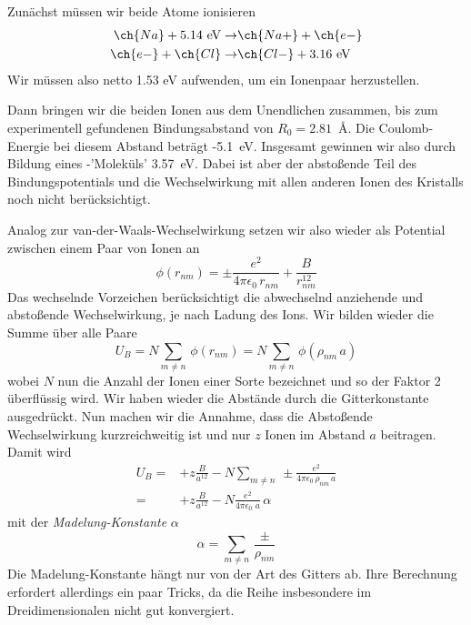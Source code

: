 Zunächst müssen wir beide Atome ionisieren
\begin{align}
 \ch{Na} + 5.14\text{ eV} \rightarrow  & \ch{Na+} + \ch{e-} \\
  \ch{e-}  + \ch{Cl} \rightarrow  & \ch{Cl-} + 3.16\text{ eV}
\end{align}
Wir müssen also netto 1.53 eV aufwenden, um ein Ionenpaar herzustellen.

Dann bringen wir die beiden Ionen aus dem Unendlichen zusammen, bis zum experimentell gefundenen Bindungsabstand von $R_0 = 2.81$~\AA. Die Coulomb-Energie bei diesem Abstand beträgt -5.1~eV. Insgesamt gewinnen wir also durch Bildung eines -'Moleküls' 3.57~eV. Dabei ist aber der abstoßende Teil des Bindungspotentials und die Wechselwirkung mit allen anderen Ionen des Kristalls noch nicht berücksichtigt.

Analog zur van-der-Waals-Wechselwirkung setzen wir also wieder als Potential zwischen einem Paar von Ionen an
\begin{equation}
 \phi(r_{nm}) = \pm \frac{e^2}{4 \pi \epsilon_0 \, r_{nm}} + \frac{B}{ r_{nm}^{12}}
\end{equation}
Das wechselnde Vorzeichen berücksichtigt die abwechselnd anziehende und abstoßende Wechselwirkung, je nach Ladung des Ions. Wir bilden wieder die Summe über alle Paare
\begin{equation}
U_B = N \sum_{m \neq n} \, \phi(r_{nm})  = N \sum_{m \neq n} \, \phi(\rho_{nm} \, a) 
\end{equation}
wobei $N$ nun die Anzahl der Ionen einer Sorte bezeichnet und so der Faktor 2 überflüssig wird. Wir haben wieder die Abstände durch die Gitterkonstante ausgedrückt. Nun machen wir die Annahme, dass die Abstoßende Wechselwirkung kurzreichweitig ist und nur $z$ Ionen im Abstand $a$ beitragen. Damit wird  
\begin{align}
U_B = & + z \frac{ B}{ a^{12}} - N \sum_{m \neq n} \, \pm \frac{e^2}{4 \pi \epsilon_0 \, \rho_{nm} \, a}  \\
= & + z \frac{ B}{ a^{12}} - N \frac{e^2}{4 \pi \epsilon_0 \,  \, a}  \, \alpha
\end{align}
mit der \emph{Madelung-Konstante} $\alpha$
\begin{equation}
 \alpha = \sum_{m \neq n} \, \frac{\pm}{\rho_{nm} }  
\end{equation}
Die Madelung-Konstante hängt nur von der Art des Gitters ab. Ihre Berechnung erfordert allerdings ein paar Tricks, da die Reihe insbesondere im Dreidimensionalen nicht gut konvergiert. 

